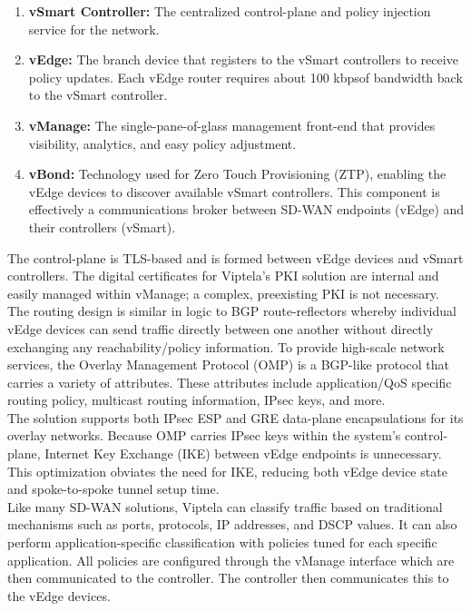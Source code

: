 \begin{enumerate}
  \item \textbf{vSmart Controller:} The centralized control-plane and policy
  injection service for the network.
  \item \textbf{vEdge:} The branch device that registers to the vSmart
  controllers to receive policy updates. Each vEdge router requires about 100
  kbpsof bandwidth back to the vSmart controller.
  \item \textbf{vManage:} The single-pane-of-glass management front-end that
  provides visibility, analytics, and easy policy adjustment.
  \item \textbf{vBond:} Technology used for Zero Touch Provisioning (ZTP),
  enabling the vEdge devices to discover available vSmart controllers. This
  component is effectively a communications broker between SD-WAN endpoints
  (vEdge) and their controllers (vSmart).
\end{enumerate}

The control-plane is TLS-based and is formed between vEdge devices and vSmart
controllers. The digital certificates for Viptela’s PKI solution are internal
and easily managed within vManage; a complex, preexisting PKI is not
necessary. The routing design is similar in logic to BGP route-reflectors
whereby individual vEdge devices can send traffic directly between one another
without directly exchanging any reachability/policy information. To provide
high-scale network services, the Overlay Management Protocol (OMP) is a
BGP-like protocol that carries a variety of attributes. These attributes
include application/QoS specific routing policy, multicast routing
information, IPsec keys, and more. \\

The solution supports both IPsec ESP and GRE data-plane encapsulations for its
overlay networks. Because OMP carries IPsec keys within the system’s
control-plane, Internet Key Exchange (IKE) between vEdge endpoints is
unnecessary. This optimization obviates the need for IKE, reducing both vEdge
device state and spoke-to-spoke tunnel setup time. \\

Like many SD-WAN solutions, Viptela can classify traffic based on traditional
mechanisms such as ports, protocols, IP addresses, and DSCP values. It can
also perform application-specific classification with policies tuned for each
specific application. All policies are configured through the vManage
interface which are then communicated to the controller. The controller then
communicates this to the vEdge devices. \\

